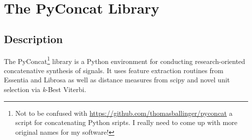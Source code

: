 %	
%

\chapter{The PyConcat Library}
\label{app:pyconcat}

\section{Description}

The PyConcat\footnote{Not to be confused with \url{https://github.com/thomasballinger/pyconcat} a script for concatenating Python sripts. I really need to come up with more original names for my software!} library is a Python environment for conducting research-oriented concatenative synthesis of signals. It uses feature extraction routines from Essentia and Librosa as well as distance measures from scipy and novel unit selection via \textit{k}-Best Viterbi.

